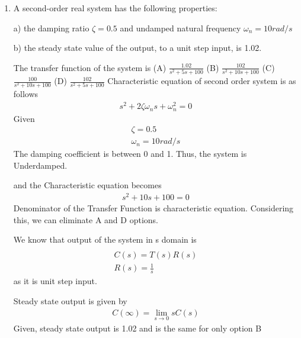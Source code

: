 \begin{enumerate}[label=\thesection.\arabic*.,ref=\thesection.\theenumi]

\item A second-order real system has the following properties:

a) the damping ratio $\zeta=0.5$ and undamped natural frequency $\omega_n=10rad/s$ 

b) the steady state value of the output, to a unit step input, is 1.02.

The transfer function of the system is\newline
(A) $\frac{1.02}{s^2+5s+100}$    (B) $\frac{102}{s^2+10s+100}$\newline
(C) $\frac{100}{s^2+10s+100}$  (D) $\frac{102}{s^2+5s+100}$ \newline
\solution Characteristic equation of second order system is as follows
\newline
\begin{align}
s^2+2\zeta\omega_ns+\omega_n^2=0
\end{align}
Given
\begin{align}
\zeta=0.5
\\
\omega_n=10rad/s
\end{align}
The damping coefficient is between 0 and 1. Thus, the system is Underdamped.

and the Characteristic equation becomes 
\begin{align}
 s^2+10s+100=0   
\end{align}
Denominator of the Transfer Function is characteristic equation. Considering this, we can eliminate A and D options.\newline

We know that output of the system in s domain is
\begin{align}\\
C(s)=T(s)R(s)
\\
R(s)=\frac{1}{s}
\end{align}
as it is unit step input.\newline

Steady state output is given by
\begin{align}
    C(\infty)=\lim_{s \to 0}sC(s)
\end{align}
Given, steady state output is 1.02 and is the same for only option B\newline


\end{enumerate}
